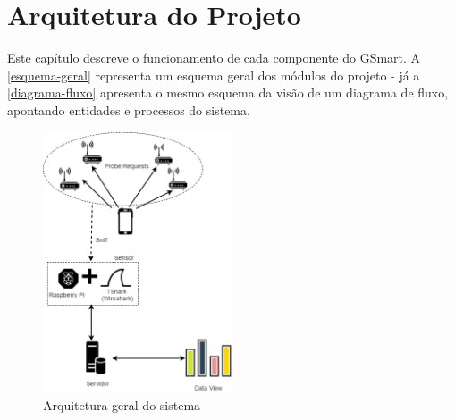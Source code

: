 \chapter{Arquitetura do Projeto}
\label{arq-cap}
Este capítulo descreve o funcionamento de cada componente do GSmart. A
\autoref{esquema-geral} representa um esquema geral dos módulos do projeto - já a
\autoref{diagrama-fluxo} apresenta o mesmo esquema da visão de um diagrama de
fluxo, apontando entidades e processos do sistema.

\begin{figure}[!h]
  \caption{\label{esquema-geral}Arquitetura geral do sistema}
  \begin{center}
    \includegraphics[width=0.50\textwidth]{img/esquema_geral.png}
  \end{center}
\end{figure}

